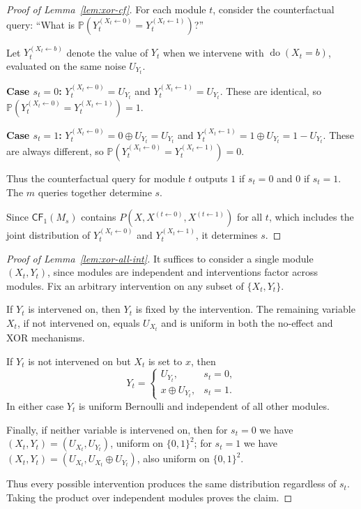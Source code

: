 \documentclass{article}
\theoremstyle{plain}
\theoremstyle{definition}
\newcommand{\Prob}{\mathbb{P}}
\newcommand{\CF}{\mathsf{CF}}
\DeclareMathOperator{\doop}{do}
\begin{document}
\begin{proof}[Proof of Lemma~\ref{lem:xor-cf}]
For each module $t$, consider the counterfactual query: ``What is $\Prob(Y_t^{(X_t \leftarrow 0)} = Y_t^{(X_t \leftarrow 1)})$?''

Let $Y_t^{(X_t \leftarrow b)}$ denote the value of $Y_t$ when we intervene with $\doop(X_t = b)$, evaluated on the same noise $U_{Y_t}$.

\textbf{Case $s_t = 0$:} $Y_t^{(X_t \leftarrow 0)} = U_{Y_t}$ and $Y_t^{(X_t \leftarrow 1)} = U_{Y_t}$. These are identical, so $\Prob(Y_t^{(X_t \leftarrow 0)} = Y_t^{(X_t \leftarrow 1)}) = 1$.

\textbf{Case $s_t = 1$:} $Y_t^{(X_t \leftarrow 0)} = 0 \oplus U_{Y_t} = U_{Y_t}$ and $Y_t^{(X_t \leftarrow 1)} = 1 \oplus U_{Y_t} = 1 - U_{Y_t}$. These are always different, so $\Prob(Y_t^{(X_t \leftarrow 0)} = Y_t^{(X_t \leftarrow 1)}) = 0$.

Thus the counterfactual query for module $t$ outputs $1$ if $s_t = 0$ and $0$ if $s_t = 1$. The $m$ queries together determine $s$.

Since $\CF_1(M_s)$ contains $P(X, X^{(t \leftarrow 0)}, X^{(t \leftarrow 1)})$ for all $t$, which includes the joint distribution of $Y_t^{(X_t \leftarrow 0)}$ and $Y_t^{(X_t \leftarrow 1)}$, it determines $s$.
\end{proof}

\begin{proof}[Proof of Lemma~\ref{lem:xor-all-int}]
It suffices to consider a single module $(X_t, Y_t)$, since modules are independent and interventions factor across modules. Fix an arbitrary intervention on any subset of $\{X_t, Y_t\}$.

If $Y_t$ is intervened on, then $Y_t$ is fixed by the intervention. The remaining variable $X_t$, if not intervened on, equals $U_{X_t}$ and is uniform in both the no-effect and XOR mechanisms.

If $Y_t$ is not intervened on but $X_t$ is set to $x$, then
\[
    Y_t = \begin{cases} U_{Y_t}, & s_t = 0,\\ x \oplus U_{Y_t}, & s_t = 1. \end{cases}
\]
In either case $Y_t$ is uniform Bernoulli and independent of all other modules.

Finally, if neither variable is intervened on, then for $s_t = 0$ we have $(X_t, Y_t) = (U_{X_t}, U_{Y_t})$, uniform on $\{0,1\}^2$; for $s_t = 1$ we have $(X_t, Y_t) = (U_{X_t}, U_{X_t} \oplus U_{Y_t})$, also uniform on $\{0,1\}^2$.

Thus every possible intervention produces the same distribution regardless of $s_t$. Taking the product over independent modules proves the claim.
\end{proof}
\end{document}
